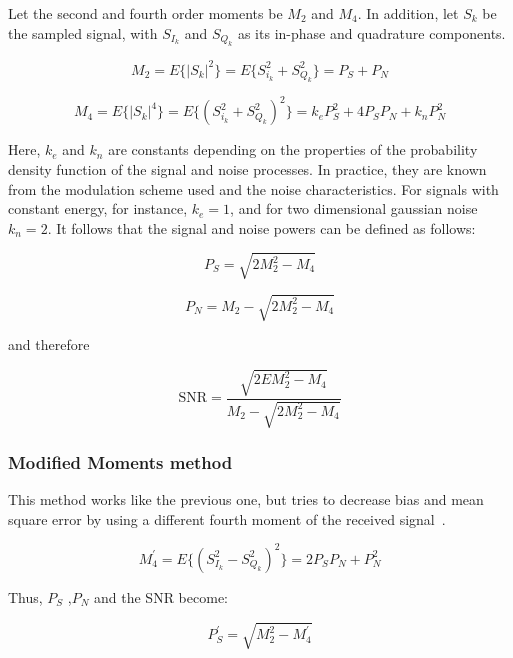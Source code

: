 \begin{refsection}
Let the second and fourth order moments be $M_2$ and $M_4$. In addition, let
$S_k$ be the sampled signal, with $S_{I_k}$ and $S_{Q_k}$ as its in-phase and
quadrature components.

\begin{equation}
	M_2 = E\{|S_k|^2\} = E\{S_{i_k}^2 + S_{Q_k}^2\} = P_S + P_N
\end{equation}

\begin{equation}
	M_4 = E\{|S_k|^4\} = E\{(S_{i_k}^2 + S_{Q_k}^2)^2\} = k_e P_S^2 + 4P_S P_N + k_n P_N^2
\end{equation}

Here, $k_e$ and $k_n$ are constants depending on the properties of the
probability density function of the signal and noise processes. In practice,
they are known from the modulation scheme used and the noise characteristics.
For signals with constant energy, for instance, $k_e = 1$, and for two
dimensional gaussian noise $k_n = 2$.
It follows that the signal and noise powers can be defined as follows: 

\begin{equation}
	P_S = \sqrt{2 M_2^2 - M_ 4}
\end{equation}

\begin{equation}
	P_N = M_2 - \sqrt{2 M_2^2 - M_ 4}
\end{equation}

and therefore

\begin{equation}
	\text{SNR} = \frac{\sqrt{2EM_2^2 - M_4}}{M_2 - \sqrt{2M_2^2 - M_4}}
\end{equation}

\subsubsection*{Modified Moments method}

\indent This method works like the previous one, but tries to decrease bias and mean
square error by using a different fourth moment of the received
signal~\cite{ren05}.

\begin{equation}
	M^\prime_{4} = E\{(S^2_{I_k} - S^2_{Q_k})^2\} = 2 P_S P_N + P_N^2
\end{equation}

Thus, $P_S$ ,$P_N$ and the SNR become:

\begin{equation}
	P^\prime_S = \sqrt{M^2_2 - M^\prime_4}
\end{equation}


\end{refsection}
